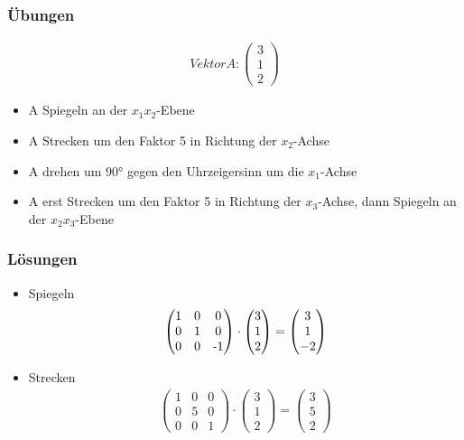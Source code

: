 \begin{frame}
	\frametitle{Übungen}
	\begin{gather*}
	Vektor A: \begin{pmatrix}
		3 \\
		1 \\
		2
	\end{pmatrix} 
	\end{gather*}
	\begin{itemize}
		\item A Spiegeln an der $x_{1}x_{2}$-Ebene
		\item A Strecken um den Faktor 5 in Richtung der $x_{2}$-Achse
		\item A drehen um 90° gegen den Uhrzeigersinn um die $x_{1}$-Achse
		\item A erst Strecken um den Faktor 5 in Richtung der $x_{3}$-Achse, dann Spiegeln an der $x_{2}x_{3}$-Ebene
	\end{itemize}
\end{frame}

\begin{frame}
	\frametitle{Lösungen}
	\begin{itemize}
		\item Spiegeln
		\begin{gather*}
		\begin{pmatrix}
			1 & 0 & 0 \\
			0 & 1 & 0 \\
			0 & 0 & $-1$
			\end{pmatrix} \cdot
			\begin{pmatrix}
				3 \\
				1 \\
				2
			\end{pmatrix} = \begin{pmatrix}
				3 \\
				1 \\
				-2
			\end{pmatrix} \end{gather*}
		\item Strecken
		\begin{gather*} \begin{pmatrix}
			1 & 0 & 0 \\
			0 & 5 & 0 \\
			0 & 0 & 1
			\end{pmatrix} \cdot
			\begin{pmatrix}
				3 \\
				1 \\
				2
			\end{pmatrix} = \begin{pmatrix}
				3 \\
				5 \\
				2
			\end{pmatrix} \end{gather*}
	\end{itemize}
\end{frame}


